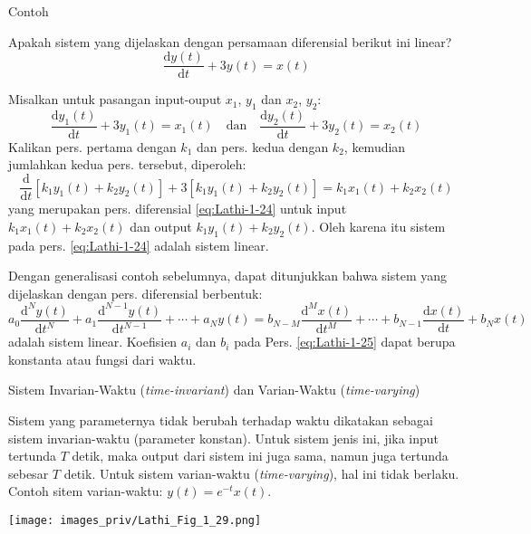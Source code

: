 \begin{frame}{Contoh}

\fontsize{9}{10}\selectfont

Apakah sistem yang dijelaskan dengan persamaan diferensial berikut ini linear?
\begin{equation}
\frac{\mathrm{d} y(t)}{\mathrm{d}t} + 3 y(t) = x(t)
\label{eq:Lathi-1-24}
\end{equation}

Misalkan untuk pasangan input-ouput $x_1$, $y_1$ dan $x_2$, $y_2$:
\begin{equation*}
\frac{\mathrm{d} y_{1}(t)}{\mathrm{d}t} + 3 y_{1}(t) = x_{1}(t) \quad \text{dan} \quad
\frac{\mathrm{d} y_{2}(t)}{\mathrm{d}t} + 3 y_{2}(t) = x_{2}(t)
\end{equation*}
Kalikan pers. pertama dengan $k_1$ dan pers. kedua dengan $k_2$, kemudian jumlahkan
kedua pers. tersebut, diperoleh:
$$
\frac{\mathrm{d}}{\mathrm{d}t} \left[
  k_{1} y_{1}(t) + k_{2} y_{2}(t) \right] +
3 \left[ k_{1} y_{1}(t) + k_{2} y_{2}(t) \right] =
k_{1} x_{1}(t) + k_{2} x_{2}(t)
$$
yang merupakan pers. diferensial \eqref{eq:Lathi-1-24} untuk input
$k_{1} x_{1}(t) + k_{2} x_{2}(t)$ dan output $k_{1} y_{1}(t) + k_{2} y_{2}(t)$.
Oleh karena itu sistem pada pers. \eqref{eq:Lathi-1-24} adalah sistem linear.

\end{frame}


\begin{frame}

Dengan generalisasi contoh sebelumnya, dapat ditunjukkan bahwa sistem yang dijelaskan
dengan pers. diferensial berbentuk:
\begin{equation}
a_0 \frac{\mathrm{d}^{N} y(t)}{\mathrm{d}t^{N}} + a_1 \frac{\mathrm{d}^{N-1} y(t)}{\mathrm{d}t^{N-1}} +
\cdots + a_{N} y(t) = b_{N-M} \frac{\mathrm{d}^{M} x(t)}{\mathrm{d}t^{M}} + \cdots +
b_{N-1} \frac{\mathrm{d} x(t)}{\mathrm{d}t} + b_{N} x(t)
\label{eq:Lathi-1-25}
\end{equation}
adalah sistem linear. Koefisien $a_{i}$ dan $b_{i}$ pada Pers. \eqref{eq:Lathi-1-25} dapat berupa
konstanta atau fungsi dari waktu.

\end{frame}


\begin{frame}{Sistem Invarian-Waktu (\textit{time-invariant}) dan
  Varian-Waktu (\textit{time-varying})}

Sistem yang parameternya tidak berubah terhadap waktu dikatakan sebagai sistem
invarian-waktu (parameter konstan). Untuk sistem jenis ini, jika input tertunda
$T$ detik, maka output dari sistem ini juga sama, namun juga tertunda sebesar $T$ detik.
Untuk sistem varian-waktu (\textit{time-varying}), hal ini tidak berlaku.
Contoh sitem varian-waktu: $y(t) = e^{-t} x(t)$.

{\centering
\texttt{[image: images\_priv/Lathi\_Fig\_1\_29.png]}
\par}

\end{frame}



